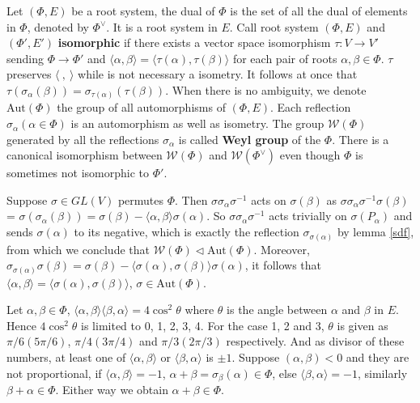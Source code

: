 \documentclass{amsbook}
\theoremstyle{definition}
\theoremstyle{remark}
\newcommand{\W}{\mathcal{W}}
\newcommand{\Aut}{\mathrm{Aut}}
\newcommand{\cartan}[2]{\langle {#1}, {#2} \rangle}
\numberwithin{section}{chapter}
\numberwithin{equation}{chapter}
\begin{document}
Let $(\Phi, E)$ be a root system, the dual of $\Phi$ is the set of all the dual of elements in $\Phi$, denoted by $\Phi^\vee$. It is a root system in $E$. Call root system $(\Phi, E)$ and $(\Phi', E')$ \textbf{isomorphic} if there exists a vector space isomorphism $\tau \colon V \to V'$ sending $\Phi \to \Phi'$ and  $\cartan{\alpha}{\beta} = \cartan{\tau(\alpha)}{\tau(\beta)}$ for each pair of roots $\alpha, \beta \in \Phi$. $\tau$ preserves $\langle \ ,\  \rangle$ while is not necessary a isometry. It follows at once that $\tau(\sigma_\alpha(\beta)) = \sigma_{\tau(\alpha)}(\tau(\beta))$. When there is no ambiguity, we denote $\Aut(\Phi)$ the group of all automorphisms of $(\Phi, E)$. Each reflection $\sigma_\alpha(\alpha\in\Phi)$ is an automorphism as well as isometry. The group $\W(\Phi)$ generated by all the reflections $\sigma_\alpha$ is called \textbf{Weyl group} of the $\Phi$. There is a canonical isomorphism between $\W(\Phi)$ and $\W(\Phi^\vee)$ even though $\Phi$ is sometimes not isomorphic to $\Phi'$.

Suppose $\sigma \in GL(V)$ permutes $\Phi$. Then $\sigma \sigma_\alpha \sigma^{-1}$ acts on $\sigma(\beta)$ as $\sigma \sigma_\alpha \sigma^{-1} \sigma(\beta)$ = $\sigma(\sigma_\alpha(\beta)) = \sigma(\beta) - \cartan{\alpha}{\beta}\sigma(\alpha)$. So $\sigma \sigma_\alpha \sigma^{-1}$ acts trivially on $\sigma(P_\alpha)$ and sends $\sigma(\alpha)$ to its negative, which is exactly the reflection $\sigma_{\sigma(\alpha)}$ by lemma \ref{sdf}, from which we conclude that $\W(\Phi) \triangleleft \Aut(\Phi)$. Moreover, $\sigma_{\sigma(\alpha)} \sigma(\beta)= \sigma(\beta) - \cartan{\sigma(\alpha)}{\sigma(\beta)}\sigma(\alpha)$, it follows that $\cartan{\alpha}{\beta} = \cartan{\sigma(\alpha)}{\sigma(\beta)}$, $\sigma\in\Aut(\Phi)$.

Let $\alpha, \beta\in\Phi$, $\cartan{\alpha}{\beta}\cartan{\beta}{\alpha} = 4\cos^2\theta$ where $\theta$ is the angle between $\alpha$ and $\beta$ in $E$. Hence $4\cos^2\theta$ is limited to 0, 1, 2, 3, 4. For the case 1, 2 and 3, $\theta$ is given as $\pi/6(5\pi/6)$, $\pi/4(3\pi/4)$ and $\pi/3(2\pi/3)$ respectively. And as divisor of these numbers, at least one of $\cartan{\alpha}{\beta}$ or $\cartan{\beta}{\alpha}$ is $\pm1$. Suppose $(\alpha, \beta) < 0$ and they are not proportional, if $\cartan{\alpha}{\beta} = -1$, $\alpha + \beta = \sigma_\beta(\alpha) \in \Phi$, else $\cartan{\beta}{\alpha} = -1$, similarly $\beta + \alpha\in \Phi$. Either way we obtain $\alpha + \beta \in \Phi$.


\end{document}
